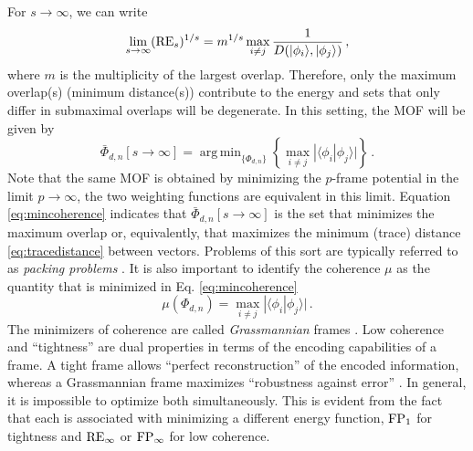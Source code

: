 \documentclass[%
superscriptaddress,
amsmath,amssymb,
 aps,
pra,
floatfix,
]{revtex4-2}
\DeclareMathOperator*{\argmin}{arg\,min}
\begin{document}
For $s \to \infty$, we can write 
%
\begin{equation}
    \lim_{s\to\infty} ({\rm RE}_s)^{1/s} = m^{1/s} \max_{i \neq j}  \frac{1}{D(|\phi_i \rangle, |\phi_j \rangle)} \,,
\end{equation}
%
where $m$ is the multiplicity of the largest overlap. Therefore, only the maximum overlap(s) (minimum distance(s)) contribute to the energy and sets that only differ in submaximal overlaps will be degenerate. In this setting, the MOF will be given by 
%
\begin{equation}
    \bar \Phi_{d, n}[s \to \infty] = \argmin_{\{\Phi_{d, n}\}} \left\{ \max_{i \neq j} |\langle \phi_i | \phi_j \rangle| \right\} \,.
    \label{eq:mincoherence}
\end{equation}
%
Note that the same MOF is obtained by minimizing the $p$-frame potential in the limit $p \to \infty$, the two weighting functions are equivalent in this limit. Equation \eqref{eq:mincoherence} indicates that $\bar \Phi_{d, n}[s \to \infty]$ is the set that minimizes the maximum overlap or, equivalently, that maximizes the minimum (trace) distance \eqref{eq:tracedistance} between vectors. Problems of this sort are typically referred to as \emph{packing problems} \cite{packing}. It is also important to identify the coherence $\mu$ as the quantity that is minimized in Eq. \eqref{eq:mincoherence}
%
\begin{equation}
    \mu(\Phi_{d, n}) = \max_{i \neq j} |\langle \phi_i | \phi_j \rangle| \,.
    \label{eq:coherence}
\end{equation}
%
The minimizers of coherence are called \emph{Grassmannian} frames \cite{strohmer2003grassmannian}. Low coherence and ``tightness'' are dual properties in terms of the encoding capabilities of a frame. A tight frame allows ``perfect reconstruction'' of the encoded information, whereas a Grassmannian frame maximizes ``robustness against error'' \cite{haas2017on}. In general, it is impossible to optimize both simultaneously. This is evident from the fact that each is associated with minimizing a different energy function, ${\rm FP}_1$ for tightness and ${\rm RE}_\infty$ or ${\rm FP}_\infty$ for low coherence. 
\end{document}
